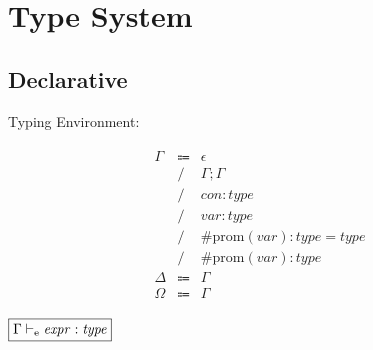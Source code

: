 \chapter{Type System}

\section{Declarative}

Typing Environment:

\begin{align*}
    \begin{array}{rcll}
        \Gamma
        &\Coloneq &\epsilon \\
        &\mathrel{/} &\Gamma; \Gamma \\
        &\mathrel{/} &\mathit{con}: \mathit{type} \\
        &\mathrel{/} &\mathit{var}: \mathit{type} \\
        &\mathrel{/} &\mathrm{\#prom}(\mathit{var}): \mathit{type} = \mathit{type} \\
        &\mathrel{/} &\mathrm{\#prom}(\mathit{var}): \mathit{type} \\
        \Delta
        &\Coloneq &\Gamma \\
        \Omega
        &\Coloneq &\Gamma
    \end{array}
\end{align*}

$\fbox{$\Gamma \vdash_\mathrm{e} \mathit{expr}: \mathit{type}$}$

